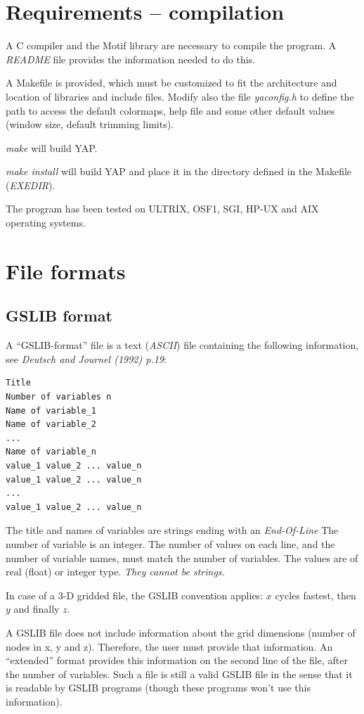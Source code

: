 \section{Requirements -- compilation}
\label{compilation}

A C compiler and the Motif library are necessary to compile the program.
A {\em README} file provides the information needed to do this.

A Makefile is provided, which must be customized to fit
the architecture and location of libraries and include files.
Modify also the file {\em yaconfig.h} to define the path to access the default
colormaps, help file and some other default values
(window size, default trimming limits).

{\em make} will build YAP.

{\em make install} will build YAP and place it in the directory defined in the
Makefile ({\em EXEDIR}).

The program has been tested on ULTRIX, OSF1, SGI, HP-UX and AIX operating
systems.

\section{File formats}
\label{formats}

 \subsection{GSLIB format}
 \label{gslib_format}

A ``GSLIB-format'' file is a text ({\em ASCII}) file containing the
following information, see {\em Deutsch and Journel (1992) p.19}:
\begin{verbatim}
Title
Number of variables n
Name of variable_1
Name of variable_2
...
Name of variable_n
value_1 value_2 ... value_n
value_1 value_2 ... value_n
...
value_1 value_2 ... value_n
\end{verbatim}

The title  and names of variables are strings ending with an {\em End-Of-Line}
The number of variable is an integer.
The number of values on each line, and the number of variable names, must
match the number of variables. The values are of real (float) or integer type.
{\em They cannot be strings.}

In case of a 3-D gridded file, the GSLIB convention applies:
$x$ cycles fastest, then $y$ and finally $z$.

A GSLIB file does not include information about the grid dimensions
(number of nodes in x, y and z). Therefore, the user must provide that
information.
An ``extended'' format provides this information on the second line of the
file, after the number of variables.
Such a file is still a valid GSLIB file in the sense that it is readable
by GSLIB programs (though these programs won't use this information).

